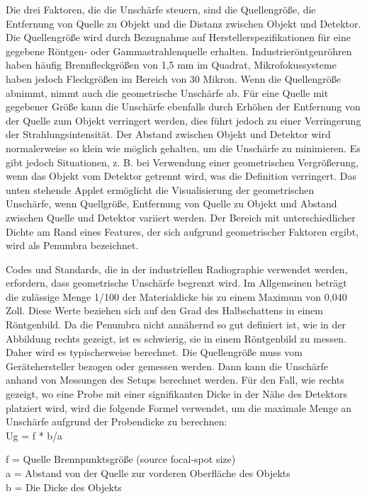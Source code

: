 Die drei Faktoren, die die Unschärfe steuern, sind die Quellengröße, die Entfernung von Quelle zu Objekt und die Distanz zwischen Objekt und Detektor. Die Quellengröße wird durch Bezugnahme auf Herstellerspezifikationen für eine gegebene Röntgen- oder Gammastrahlenquelle erhalten. Industrieröntgenröhren haben häufig Brennfleckgrößen von 1,5 mm im Quadrat, Mikrofokussysteme haben jedoch Fleckgrößen im Bereich von 30 Mikron. Wenn die Quellengröße abnimmt, nimmt auch die geometrische Unschärfe ab. Für eine Quelle mit gegebener Größe kann die Unschärfe ebenfalls durch Erhöhen der Entfernung von der Quelle zum Objekt verringert werden, dies führt jedoch zu einer Verringerung der Strahlungsintensität.
Der Abstand zwischen Objekt und Detektor wird normalerweise so klein wie möglich gehalten, um die Unschärfe zu minimieren. Es gibt jedoch Situationen, z. B. bei Verwendung einer geometrischen Vergrößerung, wenn das Objekt vom Detektor getrennt wird, was die Definition verringert. Das unten stehende Applet ermöglicht die Visualisierung der geometrischen Unschärfe, wenn Quellgröße, Entfernung von Quelle zu Objekt und Abstand zwischen Quelle und Detektor variiert werden. Der Bereich mit unterschiedlicher Dichte am Rand eines Features, der sich aufgrund geometrischer Faktoren ergibt, wird als Penumbra bezeichnet.

Codes und Standards, die in der industriellen Radiographie verwendet werden, erfordern, dass geometrische Unschärfe begrenzt wird. Im Allgemeinen beträgt die zulässige Menge 1/100 der Materialdicke bis zu einem Maximum von 0,040 Zoll. Diese Werte beziehen sich auf den Grad des Halbschattens in einem Röntgenbild.
Da die Penumbra nicht annähernd so gut definiert ist, wie in der Abbildung rechts gezeigt, ist es schwierig, sie in einem Röntgenbild zu messen. Daher wird es typischerweise berechnet.
Die Quellengröße muss vom Gerätehersteller bezogen oder gemessen werden. Dann kann die Unschärfe anhand von Messungen des Setups berechnet werden.
Für den Fall, wie rechts gezeigt, wo eine Probe mit einer signifikanten Dicke in der Nähe des Detektors platziert wird, wird die folgende Formel verwendet, um die maximale Menge an Unschärfe aufgrund der Probendicke zu berechnen:\\

  Ug = f * b/a

f = Quelle Brennpunktsgröße (source focal-spot size) \\
a = Abstand von der Quelle zur vorderen Oberfläche des Objekts\\
b = Die Dicke des Objekts\\


